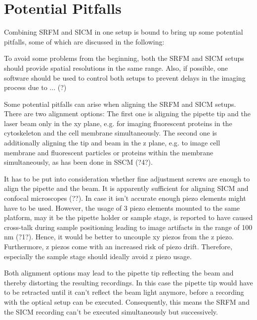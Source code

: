 \section{Potential Pitfalls}
\label{sec:pitfalls}
Combining SRFM and SICM in one setup is bound to bring up some potential pitfalls, some of which are discussed in the following:

To avoid some problems from the beginning, both the SRFM and SICM setups should provide spatial resolutions in the same range. Also, if possible, one software should be used to control both setups to prevent delays in the imaging process due to ... (?)

Some potential pitfalls can arise when aligning the SRFM and SICM setups. There are two alignment options: The first one is aligning the pipette tip and the laser beam only in the xy plane, e.g. for imaging fluorescent proteins in the cytoskeleton and the cell membrane simultaneously. The second one is additionally aligning the tip and beam in the z plane, e.g. to image cell membrane and fluorescent particles or proteins within the membrane simultaneously, as has been done in SSCM (?4?). 

It has to be put into consideration whether fine adjustment screws are enough to align the pipette and the beam. It is apparently sufficient for aligning SICM and confocal microscopes (??). In case it isn't accurate enough piezo elements might have to be used. However, the usage of 3 piezo elements mounted to the same platform, may it be the pipette holder or sample stage, is reported to have caused cross-talk during sample positioning leading to image artifacts in the range of 100 nm (?1?). Hence, it would be better to uncouple xy piezos from the z piezo. Furthermore, z piezos come with an increased risk of piezo drift. Therefore, especially the sample stage should ideally avoid z piezo usage.

Both alignment options may lead to the pipette tip reflecting the beam and thereby distorting the resulting recordings. In this case the pipette tip would have to be retracted until it can't reflect the beam light anymore, before a recording with the optical setup can be executed. Consequently, this means the SRFM and the SICM recording can't be executed simultaneously but successively.

